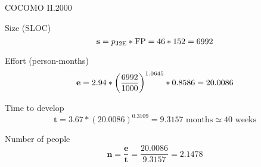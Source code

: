 \begin{frame}[allowframebreaks]{COCOMO II.2000}
	
\begin{block}{Size (SLOC)}\begin{equation*}
%
	\mSize = p_{\text{J2E}} * \mFP = 46 * 152 = 6992
%
\end{equation*}\end{block}





\begin{block}{Effort (person-months)}\begin{equation*}
%
	\mEffort = 2.94 * { \left( \frac{6992}{1000} \right) }^{1.0645} * 0.8586 = 20.0086
%
\end{equation*}\end{block}

	
\framebreak	
	
	
\begin{block}{Time to develop}\begin{equation*}
%
	\mathbf{t} = 3.67 * {\left( 20.0086 \right)}^{0.3109} = 9.3157 \text{ months} \simeq 40 \text{ weeks}
%
\end{equation*}\end{block}



\begin{block}{Number of people}\begin{equation*}
%
	\mathbf{n} = \frac{\mathbf{e}}{\mathbf{t}} = \frac{20.0086}{9.3157} = 2.1478
%
\end{equation*}\end{block}





	
\end{frame}





